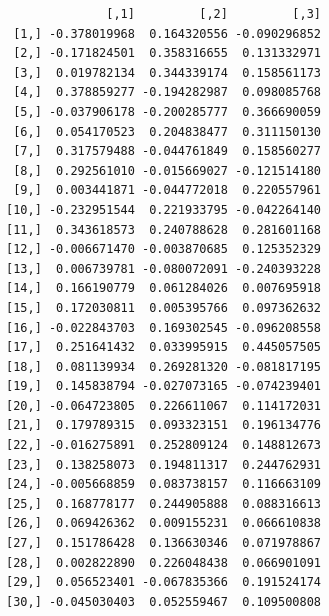 \documentclass[
  letterpaper,
  DIV=11,
  numbers=noendperiod]{scrartcl}
\newenvironment{Shaded}{\begin{snugshade}}{\end{snugshade}}
\newcommand{\AttributeTok}[1]{\textcolor[rgb]{0.40,0.45,0.13}{#1}}
\newcommand{\DecValTok}[1]{\textcolor[rgb]{0.68,0.00,0.00}{#1}}
\newcommand{\DocumentationTok}[1]{\textcolor[rgb]{0.37,0.37,0.37}{\textit{#1}}}
\newcommand{\FunctionTok}[1]{\textcolor[rgb]{0.28,0.35,0.67}{#1}}
\newcommand{\NormalTok}[1]{\textcolor[rgb]{0.00,0.23,0.31}{#1}}
\newcommand{\OtherTok}[1]{\textcolor[rgb]{0.00,0.23,0.31}{#1}}
\newcommand{\SpecialCharTok}[1]{\textcolor[rgb]{0.37,0.37,0.37}{#1}}
\begin{document}
\begin{Shaded}
\end{Shaded}

\begin{verbatim}
              [,1]         [,2]         [,3]
 [1,] -0.378019968  0.164320556 -0.090296852
 [2,] -0.171824501  0.358316655  0.131332971
 [3,]  0.019782134  0.344339174  0.158561173
 [4,]  0.378859277 -0.194282987  0.098085768
 [5,] -0.037906178 -0.200285777  0.366690059
 [6,]  0.054170523  0.204838477  0.311150130
 [7,]  0.317579488 -0.044761849  0.158560277
 [8,]  0.292561010 -0.015669027 -0.121514180
 [9,]  0.003441871 -0.044772018  0.220557961
[10,] -0.232951544  0.221933795 -0.042264140
[11,]  0.343618573  0.240788628  0.281601168
[12,] -0.006671470 -0.003870685  0.125352329
[13,]  0.006739781 -0.080072091 -0.240393228
[14,]  0.166190779  0.061284026  0.007695918
[15,]  0.172030811  0.005395766  0.097362632
[16,] -0.022843703  0.169302545 -0.096208558
[17,]  0.251641432  0.033995915  0.445057505
[18,]  0.081139934  0.269281320 -0.081817195
[19,]  0.145838794 -0.027073165 -0.074239401
[20,] -0.064723805  0.226611067  0.114172031
[21,]  0.179789315  0.093323151  0.196134776
[22,] -0.016275891  0.252809124  0.148812673
[23,]  0.138258073  0.194811317  0.244762931
[24,] -0.005668859  0.083738157  0.116663109
[25,]  0.168778177  0.244905888  0.088316613
[26,]  0.069426362  0.009155231  0.066610838
[27,]  0.151786428  0.136630346  0.071978867
[28,]  0.002822890  0.226048438  0.066901091
[29,]  0.056523401 -0.067835366  0.191524174
[30,] -0.045030403  0.052559467  0.109500808
\end{verbatim}
\end{document}
